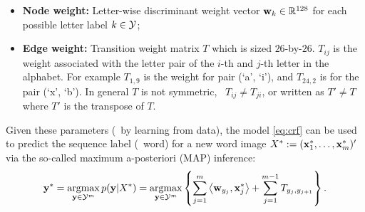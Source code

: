 \documentclass[11pt]{report}
\begin{document}
	\vspace{-1em}
	\begin{itemize}
		\item {\bf Node weight:} Letter-wise discriminant weight vector $\mathbf{\boldsymbol{w}}_k \in \mathbb{R}^{128}$ for each possible letter label $k \in \mathcal{Y}$;
		\item {\bf Edge weight:} Transition weight matrix $T$ which is sized $26$-by-$26$.
		$T_{ij}$ is the weight associated with the letter pair of the $i$-th and $j$-th letter in the alphabet.  For example $T_{1,9}$ is the weight for pair (`a', `i'), and $T_{24,2}$ is for the pair (`x', `b'). In general $T$ is not symmetric, \ie\ $T_{ij} \neq T_{ji}$, or written as $T' \neq T$ where $T'$ is the transpose of $T$.
	\end{itemize}
	
	Given these parameters (\eg\ by learning from data), the model \eqref{eq:crf} can be used to predict the sequence label (\ie\ word) for a new word image $X^* := (\mathbf{\boldsymbol{x}}^*_1, \ldots, \mathbf{\boldsymbol{x}}^*_m)'$ via the so-called maximum a-posteriori (MAP) inference:
	\begin{align}
	\label{eq:crf_decode}
	\mathbf{\boldsymbol{y}}^* = \operatorname*{\mathrm{argmax}}_{\mathbf{\boldsymbol{y}} \in \mathcal{Y}^m} p(\mathbf{\boldsymbol{y}} | X^*)
	= \operatorname*{\mathrm{argmax}}_{\mathbf{\boldsymbol{y}} \in \mathcal{Y}^m} \left\{ \sum_{j=1}^m \left\langle \mathbf{\boldsymbol{w}}_{y_j},\mathbf{\boldsymbol{x}}^*_j \right\rangle + \sum_{j=1}^{m-1} T_{y_j, y_{j+1}}\right\}.
	\end{align}
	
	
	
\end{document}
